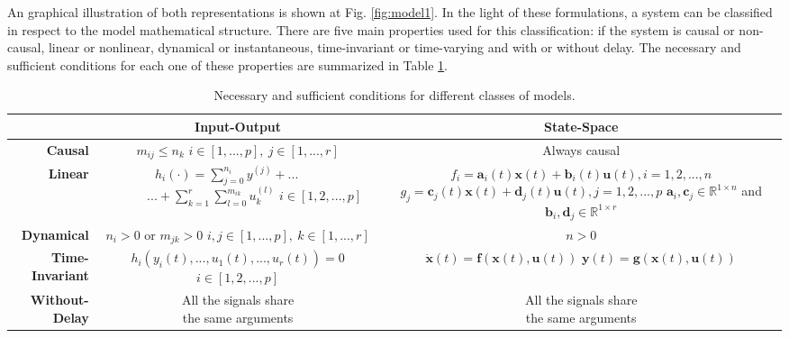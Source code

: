 \documentclass[a4paper,11pt]{book}
\numberwithin{figure}{chapter}
\numberwithin{equation}{chapter}
\numberwithin{table}{chapter}
\theoremstyle{definition}
\begin{document}
An graphical illustration of both representations is shown at Fig. \ref{fig:model1}. In the light of these formulations, a system can be classified in respect to the model mathematical structure. There are five main properties used for this classification: if the system is causal or non-causal, linear or nonlinear, dynamical or instantaneous, time-invariant or time-varying and with or without delay. The necessary and sufficient conditions for each one of these properties are summarized in Table \ref{table:classes01}.

\begin{table}[!ht]
    \centering
    \begin{tabular}{r | c | c }
     & \textbf{Input-Output} & \textbf{State-Space} \\
    \hline 
        \textbf{Causal}         & \makecell{$m_{ij} \leq n_k$\\$i \in [1,..., p],\ j \in [1,...,r]$} & Always causal \\
    \hline 
        \textbf{Linear}         & \makecell{$h_i(\cdot) = \sum_{j=0}^{n_i} y^{(j)} + ... \ \ \ \ \ \ \ \ $\\$ \ \ \ \ \ \ \ \ \ \ \ \ ... + \sum_{k=1}^{r} \sum_{l=0}^{m_{ik}} u_k^{(l)}$\\$i \in [1,2,...,p]$} & \makecell{$f_i = \bm{a}_i(t) \bm{x}(t) + \bm{b}_i(t) \bm{u}(t), i = 1,2,...,n$ \\ $g_j = \bm{c}_j(t) \bm{x}(t) + \bm{d}_j(t) \bm{u}(t), j = 1,2,...,p$ \\ $\bm{a}_i,\bm{c}_j \in \mathbb{R}^{1 \times n}$ and $\bm{b}_i, \bm{d}_j \in \mathbb{R}^{1 \times r}$} \\
    \hline 
        \textbf{Dynamical}      & \makecell{$n_i > 0$ or $m_{jk} > 0$\\$i, j \in [1,...,p],\ k \in [1,...,r]$} & $n > 0$ \\
    \hline 
        \textbf{Time-Invariant} & \makecell{$h_i(y_i(t),...,u_1(t),...,u_r(t)) = 0$\\$i \in  [1,2,...,p]$} & \makecell{$\dot{\bm{x}}(t) = \bm{f}(\bm{x}(t), \bm{u}(t))$ \\ $\bm{y}(t) = \bm{g}(\bm{x}(t), \bm{u}(t))$} \\
    \hline 
        \textbf{Without-Delay}  & \makecell{All the signals share\\the same arguments} & \makecell{All the signals share\\the same arguments} \\
    \end{tabular} 
    \caption{Necessary and sufficient conditions for different classes of models.}
    \label{table:classes01} 
\end{table} 
\end{document}
